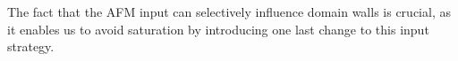 
The fact that the AFM input can selectively influence domain walls is crucial, as it enables us to avoid saturation by introducing one last change to this input strategy.


